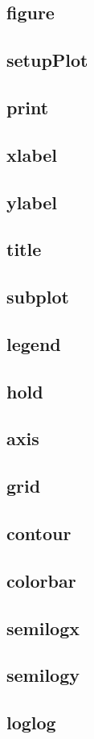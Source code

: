 \documentclass[12pt,parskip=full]{article}
\numberwithin{subsection}{section}
\begin{document}
		\subsection{figure}
		\subsection{setupPlot}
		\subsection{print}
		\subsection{xlabel}
		\subsection{ylabel}
		\subsection{title}
		\subsection{subplot}
		\subsection{legend}
		\subsection{hold}
		\subsection{axis}
		\subsection{grid}
		\subsection{contour}
		\subsection{colorbar}
		\subsection{semilogx}
		\subsection{semilogy}
		\subsection{loglog}
		
\end{document}
